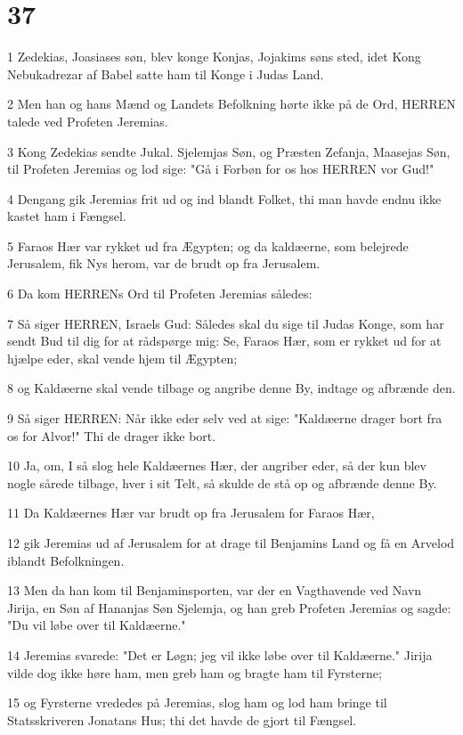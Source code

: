 \chapter{37}

\par 1 Zedekias, Joasiases søn, blev konge Konjas, Jojakims søns sted, idet Kong Nebukadrezar af Babel satte ham til Konge i Judas Land.
\par 2 Men han og hans Mænd og Landets Befolkning hørte ikke på de Ord, HERREN talede ved Profeten Jeremias.
\par 3 Kong Zedekias sendte Jukal. Sjelemjas Søn, og Præsten Zefanja, Maasejas Søn, til Profeten Jeremias og lod sige: "Gå i Forbøn for os hos HERREN vor Gud!"
\par 4 Dengang gik Jeremias frit ud og ind blandt Folket, thi man havde endnu ikke kastet ham i Fængsel.
\par 5 Faraos Hær var rykket ud fra Ægypten; og da kaldæerne, som belejrede Jerusalem, fik Nys herom, var de brudt op fra Jerusalem.
\par 6 Da kom HERRENs Ord til Profeten Jeremias således:
\par 7 Så siger HERREN, Israels Gud: Således skal du sige til Judas Konge, som har sendt Bud til dig for at rådspørge mig: Se, Faraos Hær, som er rykket ud for at hjælpe eder, skal vende hjem til Ægypten;
\par 8 og Kaldæerne skal vende tilbage og angribe denne By, indtage og afbrænde den.
\par 9 Så siger HERREN: Når ikke eder selv ved at sige: "Kaldæerne drager bort fra os for Alvor!" Thi de drager ikke bort.
\par 10 Ja, om, I så slog hele Kaldæernes Hær, der angriber eder, så der kun blev nogle sårede tilbage, hver i sit Telt, så skulde de stå op og afbrænde denne By.
\par 11 Da Kaldæernes Hær var brudt op fra Jerusalem for Faraos Hær,
\par 12 gik Jeremias ud af Jerusalem for at drage til Benjamins Land og få en Arvelod iblandt Befolkningen.
\par 13 Men da han kom til Benjaminsporten, var der en Vagthavende ved Navn Jirija, en Søn af Hananjas Søn Sjelemja, og han greb Profeten Jeremias og sagde: "Du vil løbe over til Kaldæerne."
\par 14 Jeremias svarede: "Det er Løgn; jeg vil ikke løbe over til Kaldæerne." Jirija vilde dog ikke høre ham, men greb ham og bragte ham til Fyrsterne;
\par 15 og Fyrsterne vrededes på Jeremias, slog ham og lod ham bringe til Statsskriveren Jonatans Hus; thi det havde de gjort til Fængsel.
